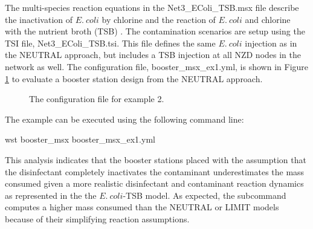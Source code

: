 The multi-species reaction equations in the Net3\_EColi\_TSB.msx file describe the inactivation of $E.~coli$ 
by chlorine and the reaction of $E.~coli$ and chlorine with the nutrient broth (TSB) \citep{MurrayAdcockRiceUberHatchett11}. 
The contamination scenarios are setup using the TSI file, Net3\_EColi\_TSB.tsi.  
This file defines the same $E.~coli$ injection as in the NEUTRAL approach, but includes a 
TSB injection at all NZD nodes in the network as well. The configuration file, booster\_msx\_ex1.yml, 
is shown in Figure \ref{fig:booster_msx_ex1} to evaluate a booster station design from the
NEUTRAL approach. 

\begin{figure}[h]
  \caption{The  configuration file for example 2.}
  \label{fig:booster_msx_ex1}
\end{figure}

The example can be executed using the following command line:
\begin{unknownListing}
wst booster_msx booster_msx_ex1.yml
\end{unknownListing}

This analysis indicates that the booster stations placed with the assumption that the disinfectant 
completely inactivates the contaminant underestimates the mass consumed given a more realistic disinfectant
and contaminant reaction dynamics as represented in the the $E.~coli$-TSB model. 
As expected, the  subcommand computes a higher mass consumed than the 
NEUTRAL or LIMIT models because of their simplifying reaction assumptions.





